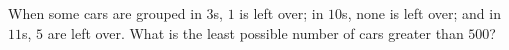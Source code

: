 When some cars are grouped in $3$s, $1$ is left over; in $10$s, none is left over; and in $11$s, $5$ are left over. What is the least possible number of cars greater than $500$?
